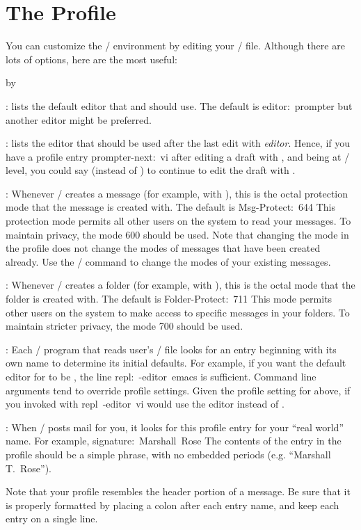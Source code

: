 \section{The Profile}
You can customize the \MH/ environment by editing your \profile/ file.
Although there are lots of options,
here are the most useful:
\smallskip
{\advance\leftskip by\parindent
\item{:} lists the default editor that  and
 should use.
The default is
\example editor:\ prompter\endexample
but another editor might be preferred.

\item{:} lists the editor that should be used
after the last edit with {\it editor}.
Hence, if you have a profile entry
\example prompter-next:\ vi\endexample
after editing a draft with ,
and being at \whatnow/ level,
you could say  (instead of )
to continue to edit the draft with .

\item{:}
Whenever \MH/ creates a message (for example, with ),
this is the octal protection mode that the message is created with.
The default is
\example Msg-Protect:\ 644\endexample
This protection mode permits all other users on the system to read
your messages.
To maintain privacy, the mode 600 should be used.
Note that changing the mode in the profile does not change the modes
of messages that have been created already.
Use the \unix/ command  to change the modes of your
existing messages.

\item{:}
Whenever \MH/ creates a folder (for example, with ),
this is the octal mode that the folder is created with.
The default is
\example Folder-Protect:\ 711\endexample
This mode permits other users on the system to make access to
specific messages in your folders.
To maintain stricter privacy, the mode 700 should be used.

\item{:}
Each \MH/ program that reads user's \profile/ file
looks for an entry beginning with its own
name to determine its initial defaults.
For example,
if you want the default editor for  to be ,
the line
\example repl:\ -editor\ emacs\endexample
is sufficient.
Command line arguments tend to override profile settings.
Given the profile setting for  above,
if you invoked  with
\example repl\ -editor\ vi\endexample
{} would use the  editor instead
of .

\item{:}
When \MH/ posts mail for you,
it looks for this profile entry for your ``real world'' name.
For example,
\example signature:\ Marshall\ Rose\endexample
The contents of the  entry in the profile should be a simple
phrase, with no embedded periods (e.g. ``Marshall T.~Rose'').
\medskip}
\noindent
Note that your profile resembles the header portion of a message.
Be sure that it is properly formatted by placing a colon after each entry
name,
and keep each entry on a single line.

